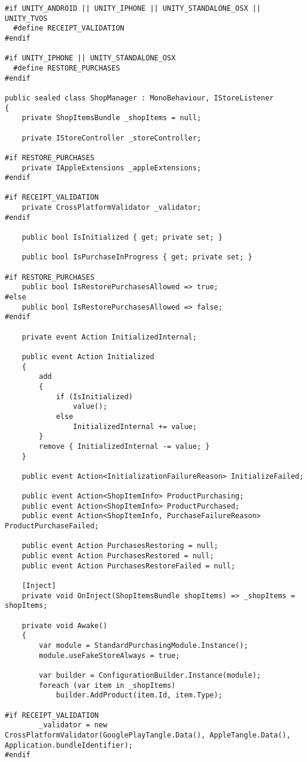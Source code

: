 \begin{lstlisting}
#if UNITY_ANDROID || UNITY_IPHONE || UNITY_STANDALONE_OSX || UNITY_TVOS
  #define RECEIPT_VALIDATION
#endif

#if UNITY_IPHONE || UNITY_STANDALONE_OSX
  #define RESTORE_PURCHASES
#endif

public sealed class ShopManager : MonoBehaviour, IStoreListener
{
    private ShopItemsBundle _shopItems = null;

    private IStoreController _storeController;

#if RESTORE_PURCHASES
    private IAppleExtensions _appleExtensions;
#endif

#if RECEIPT_VALIDATION
    private CrossPlatformValidator _validator;
#endif

    public bool IsInitialized { get; private set; }

    public bool IsPurchaseInProgress { get; private set; }

#if RESTORE_PURCHASES
    public bool IsRestorePurchasesAllowed => true;
#else
    public bool IsRestorePurchasesAllowed => false;
#endif

    private event Action InitializedInternal;

    public event Action Initialized
    {
        add
        {
            if (IsInitialized)
                value();
            else
                InitializedInternal += value;
        }
        remove { InitializedInternal -= value; }
    }

    public event Action<InitializationFailureReason> InitializeFailed;

    public event Action<ShopItemInfo> ProductPurchasing;
    public event Action<ShopItemInfo> ProductPurchased;
    public event Action<ShopItemInfo, PurchaseFailureReason> ProductPurchaseFailed;

    public event Action PurchasesRestoring = null;
    public event Action PurchasesRestored = null;
    public event Action PurchasesRestoreFailed = null;

    [Inject]
    private void OnInject(ShopItemsBundle shopItems) => _shopItems = shopItems;

    private void Awake()
    {
        var module = StandardPurchasingModule.Instance();
        module.useFakeStoreAlways = true;

        var builder = ConfigurationBuilder.Instance(module);
        foreach (var item in _shopItems)
            builder.AddProduct(item.Id, item.Type);

#if RECEIPT_VALIDATION
        _validator = new CrossPlatformValidator(GooglePlayTangle.Data(), AppleTangle.Data(), Application.bundleIdentifier);
#endif


\end{lstlisting}
